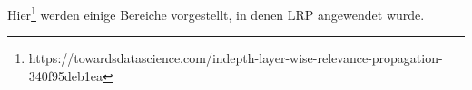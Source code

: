 \documentclass[11pt,a4paper]{article}
\numberwithin{equation}{section}
\begin{document}
	
	Hier\footnote{https://towardsdatascience.com/indepth-layer-wise-relevance-propagation-340f95deb1ea} werden einige Bereiche vorgestellt, in denen LRP angewendet wurde.

	
\end{document}

